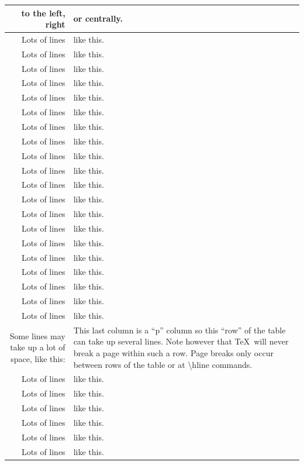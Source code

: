 \documentclass{ctexart}
\begin{document}
\begin{longtable}{@{*}r||p{1in}@{*}}
            to the left, right&or centrally.\\
            \hline\hline
                Lots of lines&like this.\\
                Lots of lines&like this.\\
                Lots of lines&like this.\\
                Lots of lines&like this.\\
                Lots of lines&like this.\\
                Lots of lines&like this.\\
                Lots of lines&like this.\\
                Lots of lines&like this.\\
                Lots of lines&like this.\\
                Lots of lines&like this.\\
                Lots of lines&like this.\\
                Lots of lines&like this.\\
                Lots of lines&like this.\\
                Lots of lines&like this.\\
                Lots of lines&like this.\\
                Lots of lines&like this.\\
                Lots of lines&like this.\\
                Lots of lines&like this.\\
                Lots of lines&like this.\\
                Lots of lines&like this.\\
                Some lines may take up a lot of space, like this:&This last column is a ``p'' column so this ``row'' of the table can take up several lines. Note however that \TeX\ will never break a page within such a row. Page breaks only occur between rows of the table or at \textsf{\textbackslash{}hline} commands.\\
                Lots of lines&like this.\\
                Lots of lines&like this.\\
                Lots of lines&like this.\\
                Lots of lines&like this.\\
                Lots of lines&like this.\\
                Lots of lines&like this.\\

\end{longtable}
\end{document}
